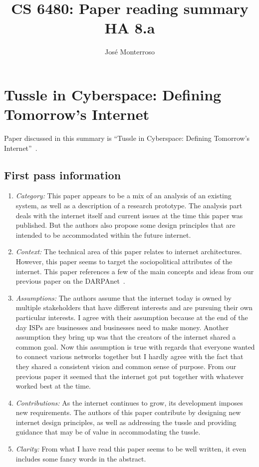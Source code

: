 \documentclass[letterpaper,twocolumn,10pt]{article}
\title{CS 6480: Paper reading summary\\
HA 8.a\\}
\author{José Monterroso}
\affil{School of Computing, University of Utah}
\begin{document}
\maketitle
\section{Tussle in Cyberspace: Defining Tomorrow's Internet}

Paper discussed in this summary is ``Tussle in Cyberspace: Defining Tomorrow's Internet''~\cite{tussle}.

\subsection{First pass information}
\label{sec:first}

\begin{enumerate}

\item {\it Category:}
This paper appears to be a mix of an analysis of an existing system, as well as a description of a research 
prototype. The analysis part deals with the internet itself and current issues at the time this paper was published.
But the authors also propose some design principles that are intended to be accommodated within the future 
internet. 

\item {\it Context:} 
The technical area of this paper relates to internet architectures. However, this paper seems to target the 
sociopolitical attributes of the internet. This paper references a few of the main concepts and ideas from our
previous paper on the DARPAnet~\cite{darpa}.

\item {\it Assumptions:}  
The authors assume that the internet today is owned by multiple stakeholders that have different interests
and are pursuing their own particular interests. I agree with their assumption because at the end of the day
ISPs are businesses and businesses need to make money. Another assumption they bring up was that the 
creators of the internet shared a common goal. Now this assumption is true with regards that everyone 
wanted to connect various networks together but I hardly agree with the fact that they shared a consistent 
vision and common sense of purpose. From our previous paper it seemed that the internet got put
together with whatever worked best at the time.

\item {\it Contributions:}
As the internet continues to grow, its development imposes new requirements. The authors of this paper 
contribute by designing new internet design principles, as well as addressing the tussle and providing guidance
that may be of value in accommodating the tussle. 

\item {\it Clarity:} 
From what I have read this paper seems to be well written, it even includes some fancy words in the abstract. 

\end{enumerate}
\end{document}

